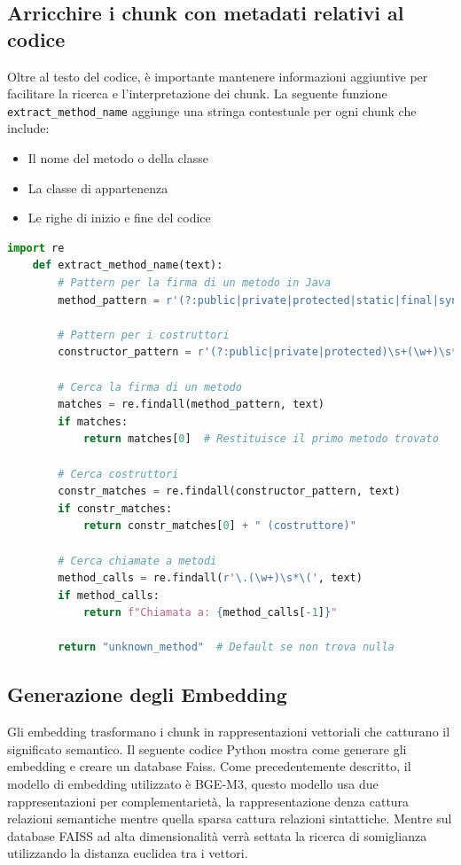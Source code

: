 \documentclass[12pt,a4paper,openright,twoside]{book}
\begin{document}
\subsection{Arricchire i chunk con metadati relativi al codice}
    Oltre al testo del codice, è importante mantenere informazioni aggiuntive per facilitare la ricerca e l'interpretazione dei chunk.
    La seguente funzione \texttt{extract\_method\_name} aggiunge una stringa contestuale per ogni chunk che include:
    \begin{itemize}
        \item Il nome del metodo o della classe
        \item La classe di appartenenza
        \item Le righe di inizio e fine del codice
    \end{itemize}

    \begin{lstlisting}[language=Python, caption={Funzione extract\_method\_name}]
    import re
    def extract_method_name(text):
        # Pattern per la firma di un metodo in Java
        method_pattern = r'(?:public|private|protected|static|final|synchronized|abstract|native)\s+[\w<>\[\]]+\s+(\w+)\s*\([^)]*\)'
        
        # Pattern per i costruttori
        constructor_pattern = r'(?:public|private|protected)\s+(\w+)\s*\([^)]*\)'
        
        # Cerca la firma di un metodo
        matches = re.findall(method_pattern, text)
        if matches:
            return matches[0]  # Restituisce il primo metodo trovato
        
        # Cerca costruttori
        constr_matches = re.findall(constructor_pattern, text)
        if constr_matches:
            return constr_matches[0] + " (costruttore)"
        
        # Cerca chiamate a metodi
        method_calls = re.findall(r'\.(\w+)\s*\(', text)
        if method_calls:
            return f"Chiamata a: {method_calls[-1]}"
        
        return "unknown_method"  # Default se non trova nulla
    \end{lstlisting}
        
\subsection{Generazione degli Embedding}
    Gli embedding trasformano i chunk in rappresentazioni vettoriali che catturano il significato semantico.
    Il seguente codice Python mostra come generare gli embedding e creare un database Faiss.
    Come precedentemente descritto, il modello di embedding utilizzato è BGE-M3, questo modello usa due rappresentazioni per complementarietà, la rappresentazione denza cattura relazioni semantiche mentre quella sparsa cattura relazioni sintattiche.
    Mentre sul database FAISS ad alta dimensionalità verrà settata la ricerca di somiglianza utilizzando la distanza euclidea tra i vettori.
    
\end{document}
